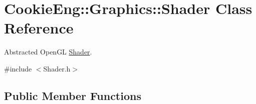 \hypertarget{class_cookie_eng_1_1_graphics_1_1_shader}{}\section{Cookie\+Eng\+:\+:Graphics\+:\+:Shader Class Reference}
\label{class_cookie_eng_1_1_graphics_1_1_shader}


Abstracted Open\+GL \hyperlink{class_cookie_eng_1_1_graphics_1_1_shader}{Shader}.  




{\ttfamily \#include $<$Shader.\+h$>$}

\subsection*{Public Member Functions}
